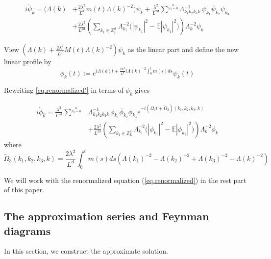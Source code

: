 \begin{equation}\label{eq.renormalized'}
\begin{split}
i \dot{\psi}_{k} 
= \bigg(\Lambda(k)&+\frac{2\lambda^2}{L^{d}} m(t)\Lambda(k)^{-2}\bigg) \psi_k
+\frac{\lambda^2}{L^{2d}} \sum^{\times}\limits_{S_3=0} \Lambda_{k_1k_2k_3k}^{-1}\,\psi_{k_1}\overline{\psi}_{k_2} \psi_{k_3}
\\
&+\frac{2\lambda^2}{L^{2d}} \left(\sum\limits_{k_1\in \mathbb{Z}^d_L} \Lambda_{k_1}^{-2}\Big(|\psi_{k_1}|^2-\mathbb{E} |\psi_{k_1}|^2\Big) \right) \Lambda_{k}^{-2}\psi_{k} 
\end{split}
\end{equation}

View $\left(\Lambda(k)+\frac{2\lambda^2}{L^{d}} M(t)\Lambda(k)^{-2}\right) \psi_k$ as the linear part and define the new linear profile by
\begin{equation}
\phi_k(t):= e^{i\Lambda(k) t+\frac{2\lambda^2}{L^{d}} i \Lambda(k)^{-2}\int^t_{0}m(s) ds} \psi_k(t) 
\end{equation}

Rewriting \eqref{eq.renormalized'} in terms of $\phi_k$ gives 

\begin{equation}\label{eq.renormalized}
\begin{split}
i \dot{\phi}_{k} 
= \frac{\lambda^2}{L^{2d}} \sum^{\times}\limits_{S_3=0} & \Lambda_{k_1k_2k_3k}^{-1}\,\phi_{k_1}\overline{\phi}_{k_2} \phi_{k_3}e^{- i (\Omega_3t+\widetilde{\Omega}_3)(k_1,k_2,k_3,k)}
\\
&+\frac{2\lambda^2}{L^{2d}} \left(\sum\limits_{k_1\in \mathbb{Z}^d_L} \Lambda_{k_1}^{-2}\Big(|\phi_{k_1}|^2-\mathbb{E} |\phi_{k_1}|^2\Big) \right) \Lambda_{k}^{-2}\phi_{k} 
\end{split}
\end{equation}
where
\begin{equation}
 \widetilde{\Omega}_3(k_1,k_2,k_3,k)=\frac{2\lambda^2}{L^{d}} \int^t_{0}m(s) ds\left(\Lambda(k_1)^{-2}-\Lambda(k_2)^{-2}+\Lambda(k_3)^{-2}-\Lambda(k)^{-2}\right)
\end{equation}

We will work with the renormalized equation (\ref{eq.renormalized}) in the rest part of this paper. 

\subsection{The approximation series and Feynman diagrams}\label{sec.appFey} In this section, we construct the approximate solution. 

